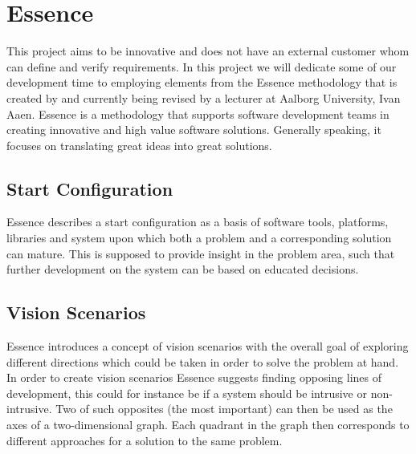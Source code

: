 
\section{Essence}
\label{sec:essence}

This project aims to be innovative and does not have an external customer whom can define and verify requirements. In this project we will dedicate some of our development time to employing elements from the Essence methodology that is created by and currently being revised by a lecturer at Aalborg University, Ivan Aaen. Essence is a methodology that supports software development teams in creating innovative and high value software solutions. Generally speaking, it focuses on translating great ideas into great solutions.  

\subsection{Start Configuration}
\label{sub:essence_start_configuration}

Essence describes a start configuration as a basis of software tools, platforms, libraries and system upon which both a problem and a corresponding solution can mature. This is supposed to provide insight in the problem area, such that further development on the system can be based on educated decisions. 

\subsection{Vision Scenarios}
\label{sub:essence_vision_scenarios}

Essence introduces a concept of vision scenarios with the overall goal of exploring different directions which could be taken in order to solve the problem at hand. In order to create vision scenarios Essence suggests finding opposing lines of development, this could for instance be if a system should be intrusive or non-intrusive. Two of such opposites (the most important) can then be used as the axes of a two-dimensional graph. Each quadrant in the graph then corresponds to different approaches for a solution to the same problem.

